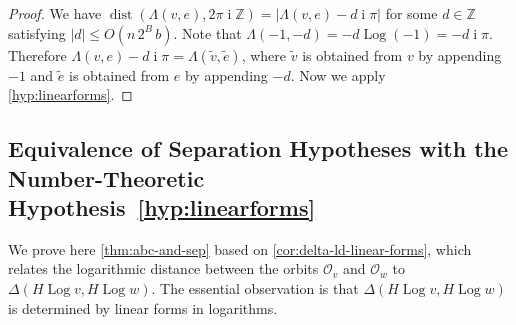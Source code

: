 \documentclass[10pt,a4paper]{article}
\theoremstyle{definition}
\DeclareMathOperator{\ii}{i}
\DeclareMathOperator{\Log}{Log}
\DeclareMathOperator{\dist}{dist}
\newcommand{\ZZ}{\mathbb{Z}}
\newcommand{\OO}{\ensuremath{\mathcal{O}}}
\numberwithin{equation}{section}
\begin{document}
\begin{proof}
We have $\dist(\Lambda(v,e),2\pi\ii\ZZ) = |\Lambda(v,e)- d \ii\pi|$
for some $d\in\ZZ$ satisfying $|d| \leq O(n\, 2^B \, b)$.
Note that
$\Lambda(-1,-d) = -d \Log(-1) = -d\ii\pi$.
Therefore
$\Lambda(v,e)- d\ii\pi = \Lambda(\tilde{v},\tilde{e})$,
where $\tilde{v}$ is obtained from $v$ by appending $-1$
and $\tilde{e}$ is obtained from $e$ by appending $-d$.
Now we apply \cref{hyp:linearforms}.
\end{proof}

\subsection{Equivalence of Separation Hypotheses with the Number-Theoretic Hypothesis~\ref{hyp:linearforms}}
\label{sec:proof-of-abc-and-sep}
We prove here \cref{thm:abc-and-sep} based on \cref{cor:delta-ld-linear-forms},
which relates the logarithmic distance between the orbits $\OO_v$ and $\OO_w$
to $\Delta(H\Log v,H\Log w)$.
The essential observation is that $\Delta(H\Log v,H\Log w)$
is determined by linear forms in logarithms.
\end{document}
